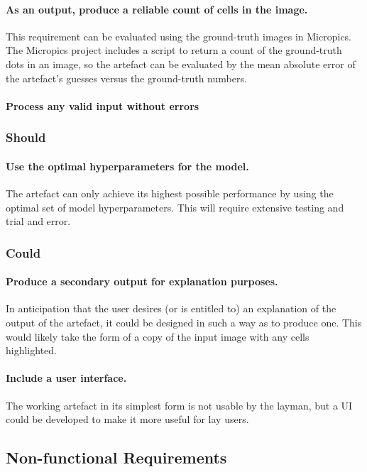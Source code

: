 \paragraph{As an output, produce a reliable count of cells in the image.}
This requirement can be evaluated using the ground-truth images in Micropics. The Micropics project includes a script to return a count of the ground-truth dots in an image, so the artefact can be evaluated by the mean absolute error of the artefact’s guesses versus the ground-truth numbers.

\paragraph{Process any valid input without errors}

\subsubsection{Should}
\paragraph{Use the optimal hyperparameters for the model.}
The artefact can only achieve its highest possible performance by using the optimal set of model hyperparameters. This will require extensive testing and trial and error.

\subsubsection{Could}
\paragraph{Produce a secondary output for explanation purposes.}
In anticipation that the user desires (or is entitled to) an explanation of the output of the artefact, it could be designed in such a way as to produce one. This would likely take the form of a copy of the input image with any cells highlighted.

\paragraph{Include a user interface.}
The working artefact in its simplest form is not usable by the layman, but a UI could be developed to make it more useful for lay users.

\subsection{Non-functional Requirements}
